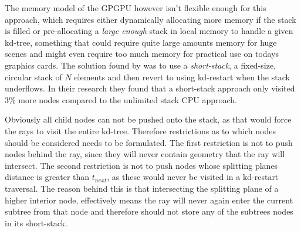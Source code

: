The memory model of the GPGPU however isn't flexible enough for this
approach, which requires either dynamically allocating more memory if
the stack is filled or pre-allocating a \textit{large enough} stack in
local memory to handle a given kd-tree, something that could require
quite large amounts memory for huge scenes and might even require too
much memory for practical use on todays graphics cards. The solution
found by \horn{} was to use a \textit{short-stack}, a fixed-size,
circular stack of $N$ elements and then revert to using kd-restart
when the stack underflows. In their research they found that a
short-stack approach only visited 3\% more nodes compared to the
unlimited stack CPU approach.


Obviously all child nodes can not be pushed onto the stack, as that
would force the rays to visit the entire kd-tree. Therefore
restrictions as to which nodes should be considered needs to be
formulated. The first restriction is not to push nodes behind the ray,
since they will never contain geometry that the ray will
intersect. The second restriction is not to push nodes whose splitting
planes distance is greater than $t_{next}$, as these would never be
visited in a kd-restart traversal. The reason behind this is that
intersecting the splitting plane of a higher interior node,
effectively means the ray will never again enter the current subtree
from that node and therefore should not store any of the subtrees
nodes in its short-stack.


